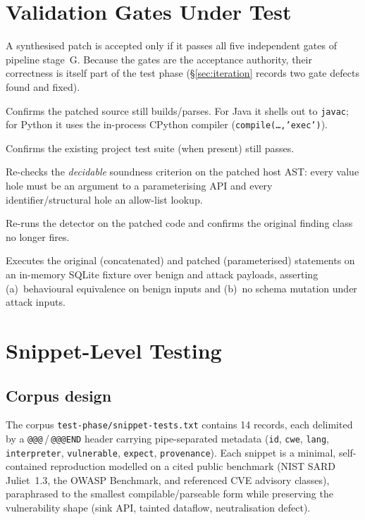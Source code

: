 \documentclass[11pt,a4paper]{article}
\newcommand{\code}[1]{\texttt{\small #1}}
\begin{document}
\section{Validation Gates Under Test}
\label{sec:gates}
A synthesised patch is accepted only if it passes all five independent
gates of pipeline stage~G. Because the gates are the acceptance authority,
their correctness is itself part of the test phase
(\S\ref{sec:iteration} records two gate defects found and fixed).

\begin{description}[leftmargin=1.6em,style=nextline]
  \item[Compile gate.] Confirms the patched source still
  builds/parses. For Java it shells out to \code{javac}; for Python it
  uses the in-process CPython compiler (\code{compile(\dots,'exec')}).
  \item[Regression gate.] Confirms the existing project test suite (when
  present) still passes.
  \item[Structural gate.] Re-checks the \emph{decidable} soundness
  criterion on the patched host AST: every \textsf{value} hole must be an
  argument to a parameterising API and every
  \textsf{identifier}/\textsf{structural} hole an allow-list lookup.
  \item[Re-SAST gate.] Re-runs the detector on the patched code and
  confirms the original finding class no longer fires.
  \item[Differential gate.] Executes the original (concatenated) and
  patched (parameterised) statements on an in-memory SQLite fixture over
  benign and attack payloads, asserting (a)~behavioural equivalence on
  benign inputs and (b)~no schema mutation under attack inputs.
\end{description}

\section{Snippet-Level Testing}
\label{sec:snippet}

\subsection{Corpus design}
The corpus \code{test-phase/snippet-tests.txt} contains 14 records, each
delimited by a \code{@@@}\,/\,\code{@@@END} header carrying
pipe-separated metadata (\code{id}, \code{cwe}, \code{lang},
\code{interpreter}, \code{vulnerable}, \code{expect}, \code{provenance}).
Each snippet is a minimal, self-contained reproduction modelled on a
cited public benchmark (NIST SARD Juliet~1.3, the OWASP Benchmark, and
referenced CVE advisory classes), paraphrased to the smallest
compilable/parseable form while preserving the vulnerability shape (sink
API, tainted dataflow, neutralisation defect).
\end{document}

